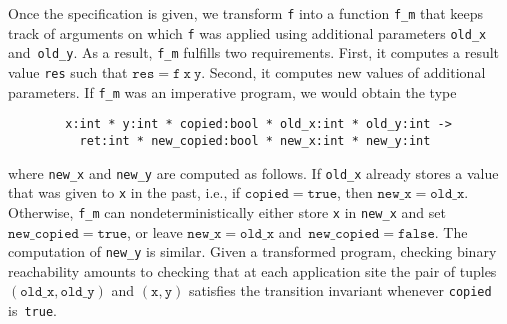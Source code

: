 Once the specification is given, we transform \texttt{f} into a
function \texttt{f\_m} that keeps track of arguments on which \texttt{f} was
applied using additional parameters \texttt{old\_x} and~\texttt{old\_y}.
As a result, \texttt{f\_m} fulfills two requirements. 
First, it computes a result value \texttt{res} such that $\mathtt{res}
= \mathtt{f\ x\ y}$. 
Second, it computes new values of additional parameters.
If \texttt{f\_m} was an imperative program, we would obtain the type
%
\begin{small}
\begin{verbatim}
        x:int * y:int * copied:bool * old_x:int * old_y:int ->
          ret:int * new_copied:bool * new_x:int * new_y:int
\end{verbatim}
\end{small}
% 
where \texttt{new\_x} and \texttt{new\_y} are computed as follows. 
If \texttt{old\_x} already stores a value that was given to \texttt{x} in the past, i.e.,
if $\mathtt{copied} = \mathtt{true}$, then $\mathtt{new\_x} = \mathtt{old\_x}$. 
Otherwise, \texttt{f\_m} can nondeterministically either store
\texttt{x} in \texttt{new\_x} and set $\mathtt{new\_copied} =
\mathtt{true}$, or leave $\mathtt{new\_x} = \mathtt{old\_x}$
and~$\mathtt{new\_copied} = \mathtt{false}$.
The computation of \texttt{new\_y} is similar.
Given a transformed program, checking binary reachability amounts to
checking that at each application site the pair of tuples
$(\mathtt{old\_x}, \mathtt{old\_y})$ and $(\mathtt{x}, \mathtt{y})$
satisfies the transition invariant whenever \texttt{copied}
is~\texttt{true}.

